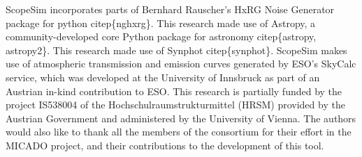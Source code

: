 
ScopeSim incorporates parts of Bernhard Rauscher's HxRG Noise Generator package for python citep\{nghxrg\}.
This research made use of Astropy, a community-developed core Python package for astronomy citep\{astropy, astropy2\}.
This research made use of Synphot citep\{synphot\}.
ScopeSim makes use of atmospheric transmission and emission curves generated by ESO's SkyCalc service, which was developed at the University of Innsbruck as part of an Austrian in-kind contribution to ESO.
This research is partially funded by the project IS538004 of the Hochschulraumstrukturmittel (HRSM) provided by the Austrian Government and administered by the University of Vienna.
The authors would also like to thank all the members of the consortium for their effort in the MICADO project, and their contributions to the development of this tool.

